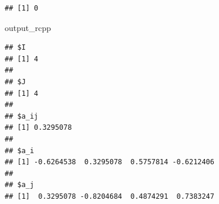 \documentclass[
]{book}
\newenvironment{Shaded}{\begin{snugshade}}{\end{snugshade}}
\newcommand{\NormalTok}[1]{#1}
\begin{document}
\begin{verbatim}
## [1] 0
\end{verbatim}

\begin{Shaded}
\begin{Highlighting}[]
\NormalTok{output\_rcpp }
\end{Highlighting}
\end{Shaded}

\begin{verbatim}
## $I
## [1] 4
## 
## $J
## [1] 4
## 
## $a_ij
## [1] 0.3295078
## 
## $a_i
## [1] -0.6264538  0.3295078  0.5757814 -0.6212406
## 
## $a_j
## [1]  0.3295078 -0.8204684  0.4874291  0.7383247
\end{verbatim}

  
\end{document}
